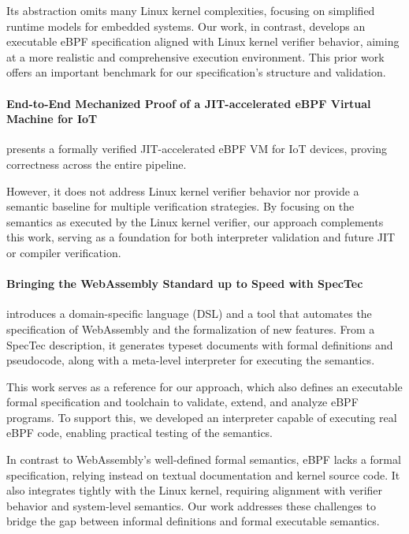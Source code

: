 \documentclass[sigconf]{acmart}
\begin{document}
Its abstraction omits many Linux kernel complexities, focusing on simplified runtime models for embedded systems. Our work, in contrast, develops an executable eBPF specification aligned with Linux kernel verifier behavior, aiming at a more realistic and comprehensive execution environment. This prior work offers an important benchmark for our specification's structure and validation.

\paragraph{End-to-End Mechanized Proof of a JIT-accelerated eBPF Virtual Machine for IoT} \cite{yuan2024endIot} presents a formally verified JIT-accelerated eBPF VM for IoT devices, proving correctness across the entire pipeline.

However, it does not address Linux kernel verifier behavior nor provide a semantic baseline for multiple verification strategies. By focusing on the semantics as executed by the Linux kernel verifier, our approach complements this work, serving as a foundation for both interpreter validation and future JIT or compiler verification.

\paragraph{Bringing the WebAssembly Standard up to Speed with SpecTec} \cite{youn2024bringing} introduces a domain-specific language (DSL) and a tool that automates the specification of WebAssembly and the formalization of new features. From a SpecTec description, it generates typeset documents with formal definitions and pseudocode, along with a meta-level interpreter for executing the semantics.

This work serves as a reference for our approach, which also defines an executable formal specification and toolchain to validate, extend, and analyze eBPF programs. To support this, we developed an interpreter capable of executing real eBPF code, enabling practical testing of the semantics.

In contrast to WebAssembly’s well-defined formal semantics, eBPF lacks a formal specification, relying instead on textual documentation and kernel source code. It also integrates tightly with the Linux kernel, requiring alignment with verifier behavior and system-level semantics. Our work addresses these challenges to bridge the gap between informal definitions and formal executable semantics.
\end{document}
